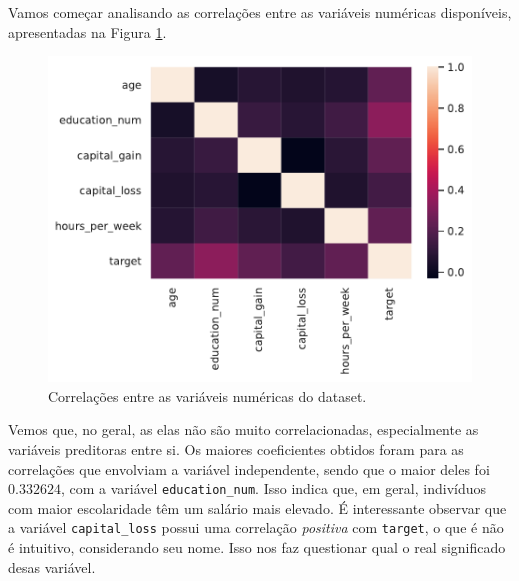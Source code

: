 \documentclass[a4paper, 12pt]{article}
\begin{document}
Vamos começar analisando as correlações entre as variáveis numéricas disponíveis, apresentadas na Figura \ref{fig: corr}.

\begin{figure}[htb]
    \begin{center}
        \includegraphics[width=.6\textwidth]{correlation.pdf}
    \end{center}
    \caption{Correlações entre as variáveis numéricas do dataset.}
    \label{fig: corr}
\end{figure}

Vemos que, no geral, as elas não são muito correlacionadas, especialmente as variáveis preditoras entre si.
Os maiores coeficientes obtidos foram para as correlações que envolviam a variável independente, sendo que o maior deles foi \( 0.332624 \), com a variável \verb|education_num|.
Isso indica que, em geral, indivíduos com maior escolaridade têm um salário mais elevado.
É interessante observar que a variável \verb|capital_loss| possui uma correlação \emph{positiva} com \verb|target|, o que é não é intuitivo, considerando seu nome.
Isso nos faz questionar qual o real significado desas variável.
\end{document}
